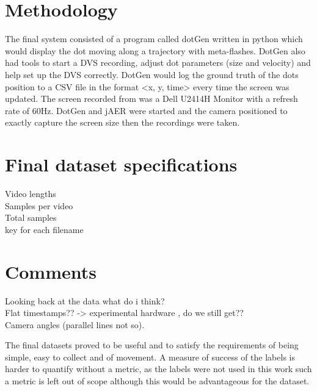 \section{Methodology}
The final system consisted of a program called dotGen written in python which would display the dot moving along a trajectory with meta-flashes.
DotGen also had tools to start a DVS recording, adjust dot parameters (size and velocity) and help set up the DVS correctly. 
DotGen would log the ground truth of the dots position to a CSV file in the format <x, y, time> every time the screen was updated.
The screen recorded from was a Dell U2414H Monitor with a refresh rate of 60Hz.
DotGen and jAER were started and the camera positioned to exactly capture the screen size then the recordings were taken. 




\section{Final dataset specifications}
Video lengths \\
Samples per video \\
Total samples \\
key for each filename \\


\section{Comments}
Looking back at the data what do i think? \\
Flat timestamps?? -> experimental hardware , do we still get??\\
Camera angles (parallel lines not so).

The final datasets proved to be useful and to satisfy the requirements of being simple, easy to collect and of movement. 
A measure of success of the labels is harder to quantify without a metric, as the labels were not used in this work such a metric is left out of scope although this would be advantageous for the dataset. 


